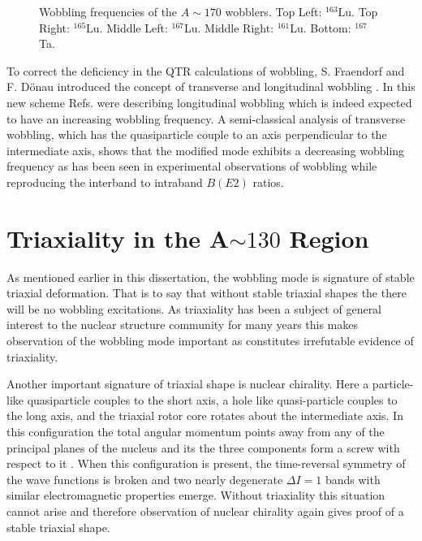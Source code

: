 \begin{figure}[ht!]
	\caption{Wobbling frequencies of the $A\sim{}170$ wobblers. Top Left: $^{163}$Lu. Top Right: $^{165}$Lu. Middle Left: $^{167}$Lu. Middle Right: $^{161}$Lu. Bottom: $^{167}$Ta.\label{fig:chp4-old-wobb-freq}}
\end{figure}

To correct the deficiency in the QTR calculations of wobbling, S. Fraendorf and F. D\"onau introduced the concept of transverse and longitudinal wobbling \cite{frauendorfTransverseWobbling}. In this new scheme Refs. \cite{oldQTRWobblingTheory1,oldQTRWobblingTheory2,oldQTRWobblingTheory3,oldQTRWobblingTheory4} were describing longitudinal wobbling which is indeed expected to have an increasing wobbling frequency. A semi-classical analysis of transverse wobbling, which has the quasiparticle couple to an axis perpendicular to the intermediate axis, shows that the modified mode exhibits a decreasing wobbling frequency as has been seen in experimental observations of wobbling while reproducing the interband to intraband $B(E2)$ ratios.


\section{Triaxiality in the A$\sim{}130$ Region}
\label{sec:trw-triax}
As mentioned earlier in this dissertation, the wobbling mode is signature of stable triaxial deformation. That is to say that without stable triaxial shapes the there will be no wobbling excitations. As triaxiality has been a subject of general interest to the nuclear structure community for many years this makes observation of the wobbling mode important as constitutes irrefutable evidence of triaxiality. 

Another important signature of triaxial shape is nuclear chirality. Here a particle-like quasiparticle couples to the short axis, a hole like quasi-particle couples to the long axis, and the triaxial rotor core rotates about the intermediate axis. In this configuration the total angular momentum points away from any of the principal planes of the nucleus and its the three components form a screw with respect to it \cite{frauendorfChirality}. When this configuration is present, the time-reversal symmetry of the wave functions is broken and two nearly degenerate $\Delta{}I=1$ bands with similar electromagnetic properties emerge. Without triaxiality this situation cannot arise and therefore observation of nuclear chirality again gives proof of a stable triaxial shape.


